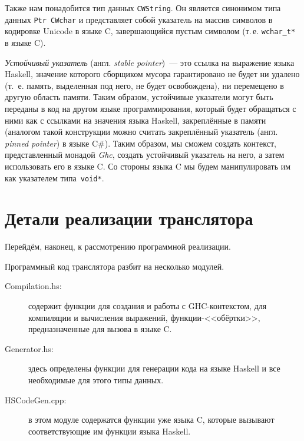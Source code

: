	Также нам понадобится тип данных \lstinline{CWString}. Он является синонимом типа данных \lstinline{Ptr CWchar} и представляет собой указатель на массив символов в кодировке Unicode в языке C, завершающийся пустым символом (т.\,е. \lstinline{wchar_t*} в языке C).
	
	\textit{Устойчивый указатель} (англ. \textit{stable pointer})~--- это ссылка на выражение языка Haskell, значение которого сборщиком мусора гарантировано не будет ни удалено (т.~е. память, выделенная под него, не будет освобождена), ни перемещено в другую область памяти. Таким образом, устойчивые указатели могут быть переданы в код на другом языке программирования, который будет обращаться с ними как с ссылками на значения языка Haskell, закреплённые в памяти (аналогом такой конструкции можно считать закреплённый указатель (англ. \textit{pinned pointer}) в языке C\#). Таким образом, мы сможем создать контекст, представленный монадой \textit{Ghc}, создать устойчивый указатель на него, а затем использовать его в языке C. Со стороны языка C мы будем манипулировать им как указателем типа~\lstinline{void*}.   %

\section{Детали реализации транслятора}
Перейдём, наконец, к рассмотрению программной реализации.

Программный код транслятора разбит на несколько модулей. 
\begin{description}
	\item[Compilation.hs:] содержит функции для создания и работы с GHC-контекстом, для компиляции и вычисления выражений, функции-<<обёртки>>, предназначенные для вызова в языке C.
	\item[Generator.hs:] здесь определены функции для генерации кода на языке Haskell и все необходимые для этого типы данных.
	\item[HSCodeGen.cpp:] в этом модуле содержатся функции уже языка C, которые вызывают соответствующие им функции языка Haskell.
\end{description}
